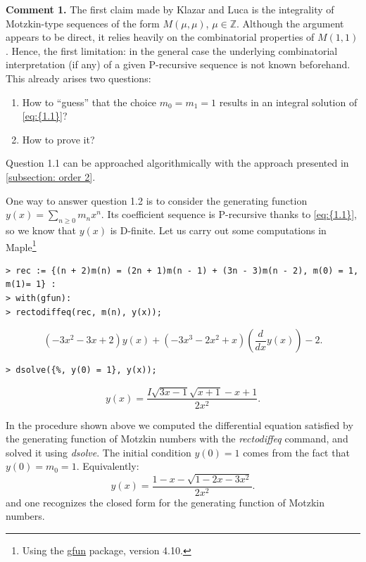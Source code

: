 \documentclass[11pt]{article}
\theoremstyle{definition}
\theoremstyle{plain}
\theoremstyle{remark}
\begin{document}
\noindent \textbf{Comment 1.} The first claim made by Klazar and Luca is the integrality of Motzkin-type sequences of the form $M(\mu,\mu)$, $\mu \in \mathbb{Z}$. Although the argument appears to be direct, it relies heavily on the combinatorial properties of $M(1,1)$. Hence, the first limitation: in the general case the underlying combinatorial interpretation (if any) of a given P-recursive sequence is not known beforehand. This already arises two questions: 
\begin{enumerate}
\item[1.1] How to ``guess'' that the choice $m_0 = m_1 = 1$ results in an integral solution of \eqref{eq:{1.1}}?
\item[1.2] How to prove it? 
\end{enumerate}
Question 1.1 can be approached algorithmically with the approach presented in \cref{subsection: order 2}.

One way to answer question 1.2 is to consider the generating function $y(x) = \sum\limits_{n \geq 0} m_nx^n$. Its coefficient sequence is P-recursive thanks to \eqref{eq:{1.1}}, so we know that $y(x)$ is D-finite. Let us carry out some computations in Maple\footnote{Using the \href{https://perso.ens-lyon.fr/bruno.salvy/software/the-gfun-package/}{gfun} package, version 4.10.}

\begin{verbatim}
> rec := {(n + 2)m(n) = (2n + 1)m(n - 1) + (3n - 3)m(n - 2), m(0) = 1,  m(1)= 1} :
> with(gfun):
> rectodiffeq(rec, m(n), y(x));
\end{verbatim}
\[(-3x^2 - 3x + 2)y(x) + (-3x^3 - 2x^2 + x)\left(\frac{d}{dx} y(x)\right) - 2.\]
\begin{verbatim}
> dsolve({%, y(0) = 1}, y(x));
\end{verbatim}
\[y(x) = \frac{I\sqrt{3x - 1}\sqrt{x + 1} - x + 1}{2x^2}.\]

In the procedure shown above we computed the differential equation satisfied by the generating function of Motzkin numbers with the \textit{rectodiffeq} command, and solved it using \textit{dsolve}. The initial condition $y(0) = 1$ comes from the fact that $y(0) = m_0 = 1$. Equivalently:
\[y(x) = \frac{1-x-\sqrt{1-2x-3x^2}}{2x^2}.\]
and one recognizes the closed form for the generating function of Motzkin numbers. 
\end{document}
